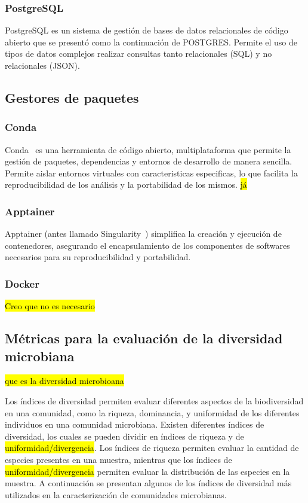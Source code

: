 \subsubsection{PostgreSQL}
PostgreSQL es un sistema de gestión de bases de datos relacionales de código abierto que se presentó como la continuación de POSTGRES. Permite el uso de tipos de datos complejos realizar consultas tanto relacionales (SQL) y no relacionales (JSON).

\subsection{Gestores de paquetes}
\subsubsection{Conda}
Conda~\cite{anaconda}  es una herramienta de código abierto, multiplataforma  que permite la gestión de paquetes, dependencias y entornos de desarrollo de manera sencilla. Permite aislar entornos virtuales con caracteristicas especificas, lo que facilita la reproducibilidad de los análisis y la portabilidad de los mismos. \hl{já}
\subsubsection{Apptainer}
Apptainer (antes llamado Singularity~\cite{kurtzer2017singularity}) simplifica la creación y ejecución de contenedores, asegurando el encapsulamiento de los componentes de softwares necesarios para su reproducibilidad y portabilidad.  
\subsubsection{Docker}
\hl{Creo que no es necesario}

\subsection{Métricas para la evaluación de la diversidad microbiana}
\hl{que es la diversidad microbioana}

Los índices de diversidad permiten evaluar diferentes aspectos de la biodiversidad en una comunidad, como la riqueza, dominancia, y uniformidad de los diferentes individuos en una comunidad microbiana. 
Existen diferentes índices de diversidad, los cuales se pueden dividir en índices de riqueza y de \hl{uniformidad/divergencia}.
 Los índices de riqueza permiten evaluar la cantidad de especies presentes en una muestra, mientras que los índices de \hl{uniformidad/divergencia} permiten evaluar la distribución de las especies en la muestra. A continuación se presentan algunos de los índices de diversidad más utilizados en la caracterización de comunidades microbianas.   

